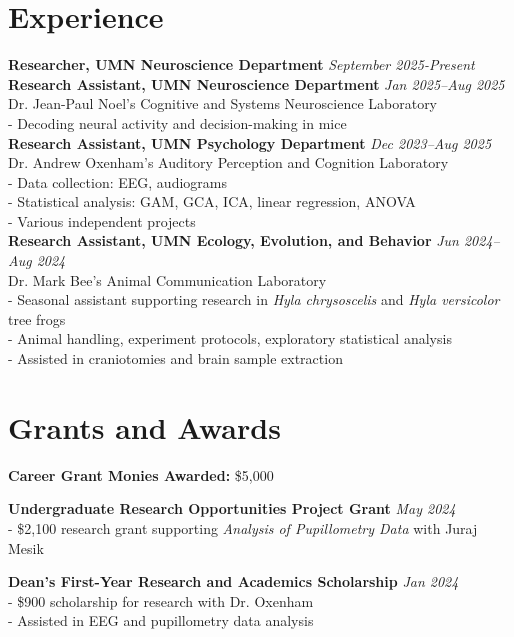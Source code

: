 \documentclass[12pt, a4paper]{article}
\begin{document}
\section*{Experience}
\textbf{Researcher, UMN Neuroscience Department} \hfill \textit{September 2025-Present}\\
\textbf{Research Assistant, UMN Neuroscience Department} \hfill \textit{Jan 2025--Aug 2025} \\
Dr. Jean-Paul Noel's Cognitive and Systems Neuroscience Laboratory \\
- Decoding neural activity and decision-making in mice\\
\textbf{Research Assistant, UMN Psychology Department} \hfill \textit{Dec 2023--Aug 2025} \\
Dr. Andrew Oxenham's Auditory Perception and Cognition Laboratory \\
- Data collection: EEG, audiograms \\
- Statistical analysis: GAM, GCA, ICA, linear regression, ANOVA \\
- Various independent projects\\
\textbf{Research Assistant, UMN Ecology, Evolution, and Behavior} \hfill \textit{Jun 2024--Aug 2024} \\
Dr. Mark Bee's Animal Communication Laboratory \\
- Seasonal assistant supporting research in \textit{Hyla chrysoscelis} and \textit{Hyla versicolor} tree frogs \\
- Animal handling, experiment protocols, exploratory statistical analysis \\
- Assisted in craniotomies and brain sample extraction\\
\vspace{-1.8em}
\section*{Grants and Awards}
\textbf{Career Grant Monies Awarded:} \$5,000

\textbf{Undergraduate Research Opportunities Project Grant} \hfill \textit{May 2024} \\
- \$2,100 research grant supporting \textit{Analysis of Pupillometry Data} with Juraj Mesik

\textbf{Dean’s First-Year Research and Academics Scholarship} \hfill \textit{Jan 2024} \\
- \$900 scholarship for research with Dr. Oxenham \\
- Assisted in EEG and pupillometry data analysis
\end{document}

